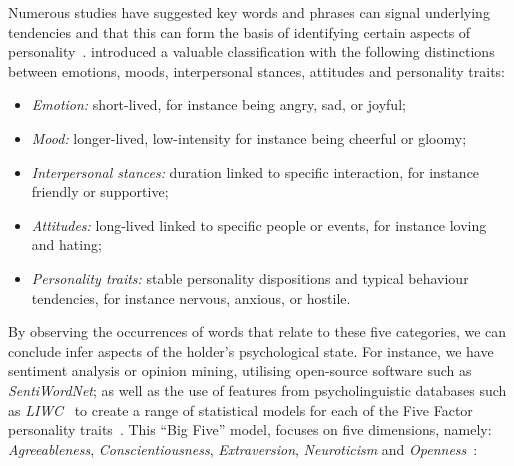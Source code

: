\documentclass[graybox]{svmult}
\begin{document}
Numerous studies have suggested key words and phrases can signal
underlying tendencies and that this can form the basis of identifying
certain aspects of
personality~\citep{iacobelli-et-al:2011,pennebaker+king:1999,oberlander+gill:2004,oberlander+gill:2006}.
\citet{scherer:1984} introduced a valuable classification with the
following distinctions between emotions, moods, interpersonal stances,
attitudes and personality traits:

\begin{itemize}
\item {\emph{Emotion:}} short-lived, for instance being angry, sad, or joyful;
\item {\emph{Mood:}} longer-lived, low-intensity for instance being cheerful or gloomy;
\item {\emph{Interpersonal stances:}} duration linked to specific
  interaction, for instance friendly or supportive;
\item {\emph{Attitudes:}} long-lived linked to specific people or
  events, for instance loving and hating;
\item {\emph{Personality traits:}} stable personality dispositions and
  typical behaviour tendencies, for instance nervous, anxious, or hostile.
\end{itemize}

By observing the occurrences of words that relate to these five
categories, we can conclude infer aspects of the holder's
psychological state. For instance, we have sentiment analysis or
opinion mining, utilising open-source software such as
{\emph{SentiWordNet}}; as well as the use of features from
psycholinguistic databases such as
{\emph{LIWC}}~\citep{pennebaker-et-al:2001} to create a range of
statistical models for each of the Five Factor personality
traits~\citep{mairesse-et-al:2007}. This ``Big Five'' model, focuses
on five dimensions, namely: {\emph{Agreeableness}},
{\emph{Conscientiousness}}, {\emph{Extraversion}},
{\emph{Neuroticism}} and
{\emph{Openness}}~\citep{norman:1963}: 
\end{document}
